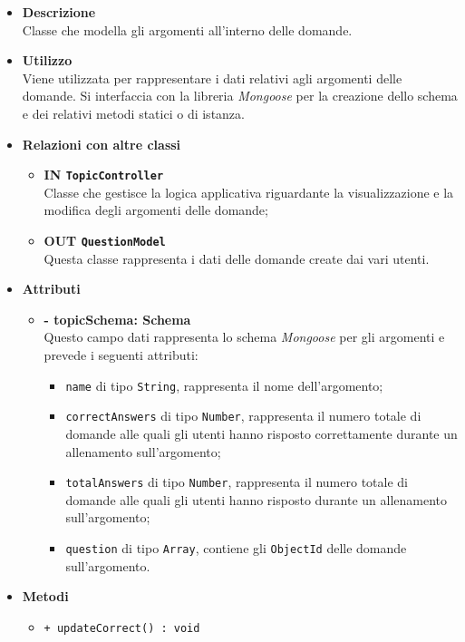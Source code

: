 \begin{itemize}
	\item \textbf{Descrizione} \\
	Classe che modella gli argomenti all'interno delle domande.
	\item \textbf{Utilizzo} \\
	Viene utilizzata per rappresentare i dati relativi agli argomenti delle domande. Si interfaccia con la libreria \textit{Mongoose} per la creazione dello schema e dei relativi metodi statici o di istanza.
	\item \textbf{Relazioni con altre classi}
		\begin{itemize}
			\item \textbf{IN \texttt{TopicController}} \\
			Classe che gestisce la logica applicativa riguardante la visualizzazione e la modifica degli argomenti delle domande;
			\item \textbf{OUT \texttt{QuestionModel}} \\
			Questa classe rappresenta i dati delle domande create dai vari utenti.
		\end{itemize}
	\item \textbf{Attributi}
		\begin{itemize}
			\item \textbf{- topicSchema: Schema} \\
			Questo campo dati rappresenta lo schema \textit{Mongoose} per gli argomenti e prevede i seguenti attributi:
				\begin{itemize}
					\item \texttt{name} di tipo \texttt{String}, rappresenta il nome dell'argomento;
					\item \texttt{correctAnswers} di tipo \texttt{Number}, rappresenta il numero totale di domande alle quali gli utenti hanno risposto correttamente durante un allenamento sull'argomento; 
					\item \texttt{totalAnswers} di tipo \texttt{Number}, rappresenta il numero totale di domande alle quali gli utenti hanno risposto durante un allenamento sull'argomento;
					\item \texttt{question} di tipo \texttt{Array}, contiene gli \texttt{ObjectId} delle domande sull'argomento.
				\end{itemize}
		\end{itemize}
	\item \textbf{Metodi}
		\begin{itemize}
			\item \texttt{+ updateCorrect() : void} \\

\end{itemize}
\end{itemize}
